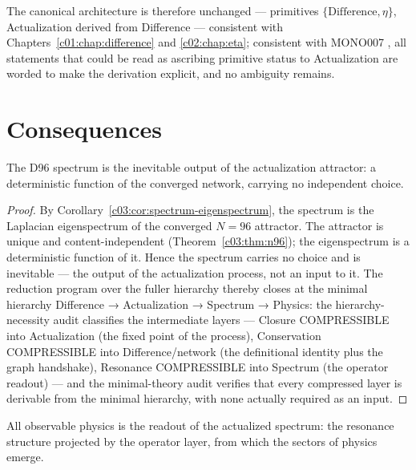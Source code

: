 The canonical architecture is therefore unchanged --- primitives $\{\text{Difference},\eta\}$,
Actualization derived from Difference --- consistent with Chapters~\ref{c01:chap:difference}
and \ref{c02:chap:eta}; consistent with MONO007 \cite{c03:MONO007}, all statements that could
be read as ascribing primitive status to Actualization are worded to make the derivation
explicit, and no ambiguity remains.

\section{Consequences}
\label{c03:sec:actualization-consequences}

\begin{theorem}
\label{c03:thm:spectrum-inevitable}
The D96 spectrum is the inevitable output of the actualization attractor: a deterministic
function of the converged network, carrying no independent choice.
\end{theorem}

\begin{proof}
By Corollary~\ref{c03:cor:spectrum-eigenspectrum}, the spectrum is the Laplacian eigenspectrum of
the converged $N=96$ attractor. The attractor is unique and content-independent
(Theorem~\ref{c03:thm:n96}); the eigenspectrum is a deterministic function of it. Hence the
spectrum carries no choice and is inevitable --- the output of the actualization process,
not an input to it. The reduction program over the fuller hierarchy thereby closes at the
minimal hierarchy Difference → Actualization → Spectrum → Physics: the hierarchy-necessity
audit \cite{c03:QG293} classifies the intermediate layers --- Closure COMPRESSIBLE into
Actualization (the fixed point of the process), Conservation COMPRESSIBLE into
Difference/network (the definitional identity plus the graph handshake), Resonance
COMPRESSIBLE into Spectrum (the operator readout) --- and the minimal-theory audit
\cite{c03:QG294} verifies that every compressed layer is derivable from the minimal hierarchy,
with none actually required as an input.
\end{proof}

\begin{corollary}
\label{c03:cor:physics-readout}
All observable physics is the readout of the actualized spectrum: the resonance structure
projected by the operator layer, from which the sectors of physics emerge.
\end{corollary}

